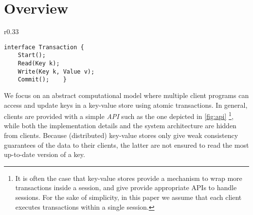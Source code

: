 \section{Overview}
\label{sec:overview}


\begin{wrapfigure}[7]{r}{0.33\textwidth}
\vspace{-10pt}
\begin{verbatim}
interface Transaction {
    Start(); 
    Read(Key k);
    Write(Key k, Value v); 
    Commit();    }
\end{verbatim}
\vspace{-10pt}
\caption{Example of Transaction API.}
\label{fig:api}
\end{wrapfigure}
We focus on an abstract computational model where multiple client programs can access and update keys in a key-value store using atomic transactions. 
In general, clients are provided with a simple \textit{API} such as the one depicted in \cref{fig:api} \cite{gdur,physicsnmsi,clockSI}\footnote{It is 
often the case that key-value stores provide a mechanism to wrap more transactions inside a session, and give 
provide appropriate APIs to handle sessions. For the sake of simplicity, in this paper we assume that each client executes transactions 
within a single session.}, while both the implementation details and the system architecture are hidden from clients. 
Because (distributed) key-value stores only give weak consistency guarantees of the data to their clients, the latter are 
not ensured to read the most up-to-date version of a key.

